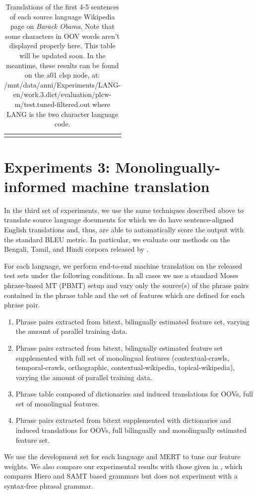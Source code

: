 \documentclass[11pt]{article}
\begin{document}
\begin{center}
\begin{longtable}{|p{1.5cm}|p{13cm}|}
\hline
\caption{Translations of the first 4-5 sentences of each source language Wikipedia page on {\it Barack Obama}. Note that some characters in OOV words aren't displayed properly here. This table will be updated soon. In the meantime, these results can be found on the a01 clsp node, at: /mnt/data/anni/Experiments/LANG-en/work.3.dict/evaluation/plcw-m/test.tuned-filtered.out where LANG is the two character language code.} \label{table:qualtrans}  \\
\end{longtable}
\end{center}

\twocolumn

\section{Experiments 3: Monolingually-informed machine translation}

In the third set of experiments, we use the same techniques described above to translate source language documents for which we do have sentence-aligned English translations and, thus, are able to automatically score the output with the standard BLEU metric. In particular, we evaluate our methods on the Bengali, Tamil, and Hindi corpora released by .

For each language, we perform end-to-end machine translation on the released test sets under the following conditions. In all cases we use a standard Moses phrase-based MT (PBMT) setup and vary only the source(s) of the phrase pairs contained in the phrase table and the set of features which are defined for each phrase pair.
\begin{enumerate}
\item{Phrase pairs extracted from bitext, bilingually estimated feature set, varying the amount of parallel training data.}
\item{Phrase pairs extracted from bitext, bilingually estimated feature set supplemented with full set of monolingual features (contextual-crawls, temporal-crawls, orthographic, contextual-wikipedia, topical-wikipedia), varying the amount of parallel training data. }
\item{Phrase table composed of dictionaries and induced translations for OOVs, full set of monolingual features.}
\item{Phrase pairs extracted from bitext supplemented with dictionaries and induced translations for OOVs, full bilingually and monolingually estimated feature set.}
\end{enumerate}
We use the development set for each language and MERT to tune our feature weights. We also compare our experimental results with those given in , which compares Hiero and SAMT based grammars but does not experiment with a syntax-free phrasal grammar.
\end{document}
